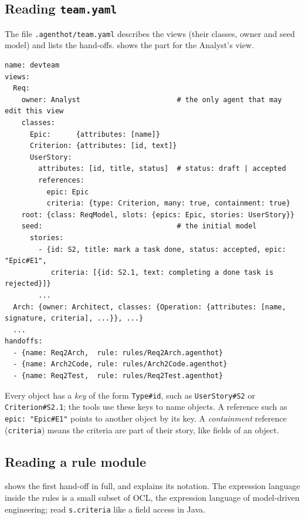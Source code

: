 \documentclass[10pt,a4paper]{article}
\newcommand{\code}[1]{\texttt{#1}}
\newcommand{\file}[1]{\texttt{#1}}
\begin{document}
\subsection{Reading \file{team.yaml}}

The file \file{.agenthot/team.yaml} describes the views (their classes,
owner and seed model) and lists the hand-offs.  shows the
part for the Analyst's view.

\begin{lstlisting}[style=raw, caption={Code excerpt: \file{templates/devteam/team.yaml} (abridged).}, label={lst:teamyaml}]
name: devteam
views:
  Req:
    owner: Analyst                       # the only agent that may edit this view
    classes:
      Epic:      {attributes: [name]}
      Criterion: {attributes: [id, text]}
      UserStory:
        attributes: [id, title, status]  # status: draft | accepted
        references:
          epic: Epic
          criteria: {type: Criterion, many: true, containment: true}
    root: {class: ReqModel, slots: {epics: Epic, stories: UserStory}}
    seed:                                # the initial model
      stories:
        - {id: S2, title: mark a task done, status: accepted, epic: "Epic#E1",
           criteria: [{id: S2.1, text: completing a done task is rejected}]}
        ...
  Arch: {owner: Architect, classes: {Operation: {attributes: [name, signature, criteria], ...}}, ...}
  ...
handoffs:
  - {name: Req2Arch,  rule: rules/Req2Arch.agenthot}
  - {name: Arch2Code, rule: rules/Arch2Code.agenthot}
  - {name: Req2Test,  rule: rules/Req2Test.agenthot}
\end{lstlisting}

Every object has a \emph{key} of the form \code{Type\#id}, such as
\code{UserStory\#S2} or \code{Criterion\#S2.1}; the tools use these keys to
name objects. A reference such as \code{epic: "Epic\#E1"} points to another
object by its key. A \emph{containment} reference (\code{criteria}) means the
criteria are part of their story, like fields of an object.

\subsection{Reading a rule module}

 shows the first hand-off in full, and
 explains its notation. The expression language inside the
rules is a small subset of OCL, the expression language of model-driven
engineering; read \code{s.criteria} like a field access in Java.
\end{document}
